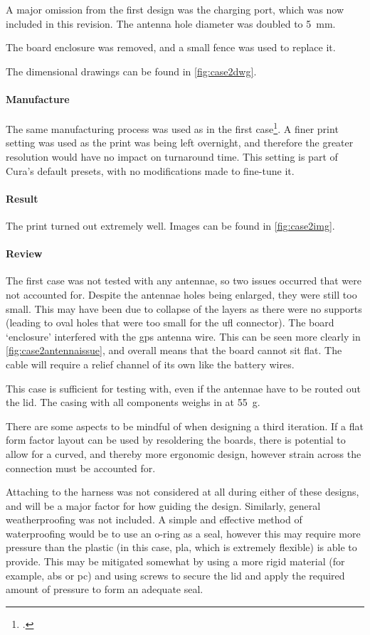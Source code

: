 A major omission from the first design was the charging port, which was now included in
this revision. The antenna hole diameter was doubled to \qty{5}{\mm}.

The board enclosure was removed, and a small fence was used to replace it.

The dimensional drawings can be found in \cref{fig:case2dwg}.

\paragraph{Manufacture}
The same manufacturing process was used as in the first case\footnote{.}.
A finer print setting was used as the print was being left overnight, and therefore the greater
resolution would have no impact on turnaround time. This setting is part of Cura's default presets,
with no modifications made to fine-tune it.

\paragraph{Result}
The print turned out extremely well. Images can be found in \cref{fig:case2img}.

\paragraph{Review}
The first case was not tested with any antennae, so two issues occurred that
were not accounted for.
Despite the antennae holes being enlarged, they were still too small. This may have been due to
collapse of the layers as there were no supports (leading to oval holes that were
too small for the \gls{ufl} connector).
The board `enclosure' interfered with the \acrshort{gps} antenna wire. This can be
seen more clearly in \cref{fig:case2antennaissue}, and overall means that the board
cannot sit flat. The cable will require a relief channel of its own
like the battery wires.

This case is sufficient for testing with, even if the antennae have to be routed
out the lid. The casing with all components weighs in at \qty{55}{\g}.

There are some aspects to be mindful of when designing a third iteration.
If a flat form factor layout can be used by resoldering the boards, there is potential to
allow for a curved, and thereby more ergonomic design, however strain across the connection
must be accounted for.

Attaching to the harness was not considered at all during either of these designs, and will
be a major factor for how guiding the design. Similarly, general weatherproofing was not included.
A simple and effective method of waterproofing would be to use an o-ring as a seal, however this may
require more pressure than the plastic (in this case, \gls{pla}, which is extremely
flexible) is able to provide. This may be mitigated somewhat by using a more rigid material
(for example, \gls{abs} or \gls{pc}) and using screws to secure the lid and apply
the required amount of pressure to form an adequate seal.

